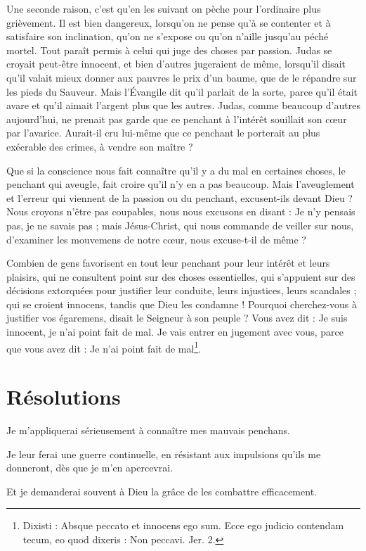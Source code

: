\documentclass[instructions.tex]{subfiles}
\begin{document}
\secundo Une seconde raison, c'est qu'en les suivant on pèche pour l'ordinaire plus grièvement. Il est bien dangereux, lorsqu'on ne pense qu'à se contenter et à satisfaire son inclination, qu'on ne s'expose ou qu'on n'aille jusqu'au péché mortel. Tout paraît permis à celui qui juge des choses par passion. Judas se croyait peut-être innocent, et bien d'autres jugeraient de même, lorsqu'il disait qu'il valait mieux donner aux pauvres le prix d'un baume, que de le répandre sur les pieds du Sauveur. Mais l'Évangile dit qu'il parlait de la sorte, parce qu'il était avare et qu'il aimait l'argent plus que les autres. Judas, comme beaucoup d'autres aujourd'hui, ne prenait pas garde que ce penchant à l'intérêt souillait son cœur par l'avarice. Aurait-il cru lui-même que ce penchant le porterait au plus exécrable des crimes, à vendre son maître ?

Que si la conscience nous fait connaître qu'il y a du mal en certaines choses, le penchant qui aveugle, fait croire qu'il n'y en a pas beaucoup. Mais l'aveuglement et l'erreur qui viennent de la passion ou du penchant, excusent-ils devant Dieu ? Nous croyons n'être pas coupables, nous nous excusons en disant : Je n'y pensais pas, je ne savais pas ; mais Jésus-Christ, qui nous commande de veiller sur nous, d'examiner les mouvemens de notre cœur, nous excuse-t-il de même ?

Combien de gens favorisent en tout leur penchant pour leur intérêt et leurs plaisirs, qui ne consultent point sur des choses essentielles, qui s'appuient sur des décisions extorquées pour justifier leur conduite, leurs injustices, leurs scandales ; qui se croient innocens, tandis que Dieu les condamne ! Pourquoi cherchez-vous à justifier vos égaremens, disait le Seigneur à son peuple ? Vous avez dit : Je suis innocent, je n'ai point fait de mal. Je vais entrer en jugement avec vous, parce que vous avez dit : Je n'ai point fait de mal\footnote{Dixisti : Absque peccato et innocens ego sum. Ecce ego judicio contendam tecum, eo quod dixeris : Non peccavi. Jer. 2.}.


\section{Résolutions}

\primo Je m'appliquerai sérieusement à connaître mes mauvais penchans.

\secundo Je leur ferai une guerre continuelle, en résistant aux impulsions qu'ils me donneront, dès que je m'en apercevrai.

\tertio Et je demanderai souvent à Dieu la grâce de les combattre efficacement.

\end{document}
